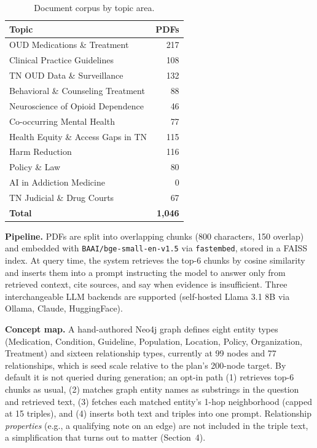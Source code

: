 \documentclass[letterpaper]{article}
\begin{document}
\begin{table}[t]
\centering\small
\caption{Document corpus by topic area.}
\label{tab:corpus}
\begin{tabular}{lr}
\toprule
Topic & PDFs \\
\midrule
OUD Medications \& Treatment & 217 \\
Clinical Practice Guidelines & 108 \\
TN OUD Data \& Surveillance & 132 \\
Behavioral \& Counseling Treatment & 88 \\
Neuroscience of Opioid Dependence & 46 \\
Co-occurring Mental Health & 77 \\
Health Equity \& Access Gaps in TN & 115 \\
Harm Reduction & 116 \\
Policy \& Law & 80 \\
AI in Addiction Medicine & 0 \\
TN Judicial \& Drug Courts & 67 \\
\midrule
\textbf{Total} & \textbf{1{,}046} \\
\bottomrule
\end{tabular}
\end{table}

\textbf{Pipeline.} PDFs are split into overlapping chunks (800 characters, 150 overlap) and embedded with \texttt{BAAI/bge-small-en-v1.5} via \texttt{fastembed}, stored in a FAISS index. At query time, the system retrieves the top-6 chunks by cosine similarity and inserts them into a prompt instructing the model to answer only from retrieved context, cite sources, and say when evidence is insufficient. Three interchangeable LLM backends are supported (self-hosted Llama 3.1 8B via Ollama, Claude, HuggingFace).

\textbf{Concept map.} A hand-authored Neo4j graph defines eight entity types (Medication, Condition, Guideline, Population, Location, Policy, Organization, Treatment) and sixteen relationship types, currently at 99 nodes and 77 relationships, which is seed scale relative to the plan's 200-node target. By default it is not queried during generation; an opt-in path (1) retrieves top-6 chunks as usual, (2) matches graph entity names as substrings in the question and retrieved text, (3) fetches each matched entity's 1-hop neighborhood (capped at 15 triples), and (4) inserts both text and triples into one prompt. Relationship \emph{properties} (e.g., a qualifying note on an edge) are not included in the triple text, a simplification that turns out to matter (Section~4).
\end{document}
